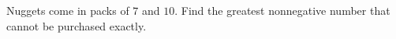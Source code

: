 Nuggets come in packs of $7$ and $10$. Find the greatest nonnegative number that cannot be purchased exactly.
